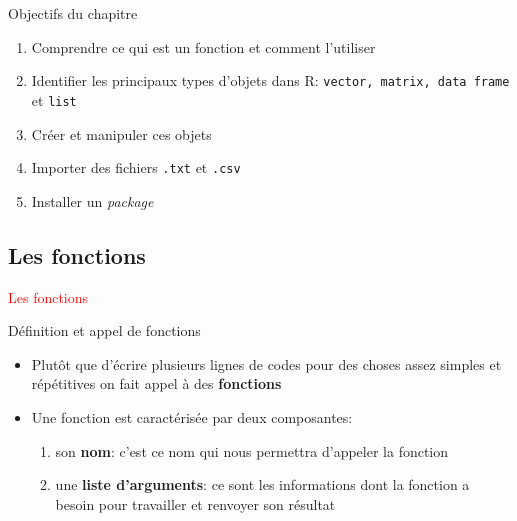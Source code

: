 \documentclass[11pt]{beamer}\usepackage[]{graphicx}\usepackage[]{color}
\newcommand{\code}[1]{\texttt{#1}}
\begin{document}
\begin{frame}[plain]
\hspace*{-1.0cm}\parbox[t]{\textwidth}{
\begin{block}{Objectifs du chapitre}
\begin{enumerate}
\item Comprendre ce qui est un fonction et comment l'utiliser
\item Identifier les principaux types d'objets dans R: \code{vector, matrix, data frame} et \code{list} 
\item Cr\'{e}er et manipuler ces objets
\item Importer des fichiers \code{.txt} et \code{.csv}
\item Installer un \textit{package}
\end{enumerate}
\end{block}
}
\end{frame}





\subsection{Les fonctions}

\begin{frame}
 \begin{center}
  \Huge{\textcolor{red}{Les fonctions}}
 \end{center}
\end{frame}



\begin{frame}{Définition et appel de fonctions}
\begin{itemize}
 \setlength\itemsep{2em}
\item Plutôt que d'écrire plusieurs lignes de codes pour des choses assez simples et répétitives on fait appel à des \textbf{fonctions}
\pause \item Une fonction est caractérisée par deux composantes:
\pause 
\begin{enumerate}
\normalsize
\item son \textbf{nom}: c'est ce nom qui nous permettra d'appeler la fonction
\pause \item une \textbf{liste d'arguments}: ce sont les informations dont la fonction a besoin pour travailler et renvoyer son résultat
\end{enumerate}
\end{itemize}
\end{frame}
\end{document}
